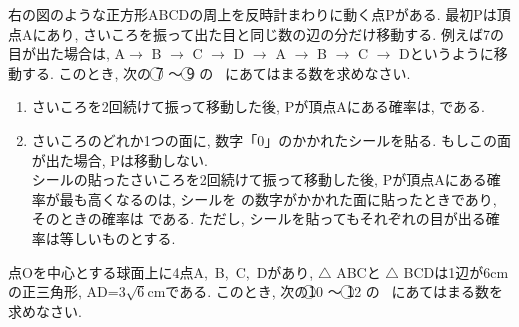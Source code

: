 \documentclass[dvipdfmx, titlepage, 11pt]{jsarticle}
\newcommand{\ncircle}[1]{\textcircled{\scriptsize #1}}
\newcommand{\nbox}[1]{\fbox{\hspace{5pt} \textcircled{\scriptsize #1}\hspace{5pt} }}
\newcommand{\ebox}{\fbox{　\hspace{10pt} }}
\begin{document}
\begin{minipage}{0.7\hsize}
  右の図のような正方形ABCDの周上を反時計まわりに動く点Pがある. 最初Pは頂点Aにあり, さいころを振って出た目と同じ数の辺の分だけ移動する. 例えば7の目が出た場合は, A$\to$ B $\to$ C $\to$ D $\to$ A $\to$ B $\to$ C $\to$ Dというように移動する. このとき, 次の \ncircle{7} 〜 \ncircle{9} の \ebox \ にあてはまる数を求めなさい.
\end{minipage}
\begin{minipage}{0.26\hsize}
  \begin{center}
  \end{center}
\end{minipage}

\begin{enumerate}[(1)]
\item さいころを2回続けて振って移動した後, Pが頂点Aにある確率は, \nbox{7} である.
  \newpage
\item さいころのどれか1つの面に, 数字「0」のかかれたシールを貼る. もしこの面が出た場合, Pは移動しない.\\
  シールの貼ったさいころを2回続けて振って移動した後, Pが頂点Aにある確率が最も高くなるのは, シールを \nbox{8} の数字がかかれた面に貼ったときであり, そのときの確率は \nbox{9} である. ただし, シールを貼ってもそれぞれの目が出る確率は等しいものとする.
\end{enumerate}
\newpage

\begin{multicols}{2}
  \noindent {}\hspace{10pt} 点Oを中心とする球面上に4点A,\ B,\ C,\ Dがあり, $\triangle$ ABCと $\triangle$ BCDは1辺が6cmの正三角形, AD=$3\sqrt{6}$cmである. このとき, 次の\ncircle{10} 〜 \ncircle{12} の \ebox \ にあてはまる数を求めなさい.
  \begin{center}
  \end{center}
\end{multicols}
\vspace{3cm}
\end{document}
